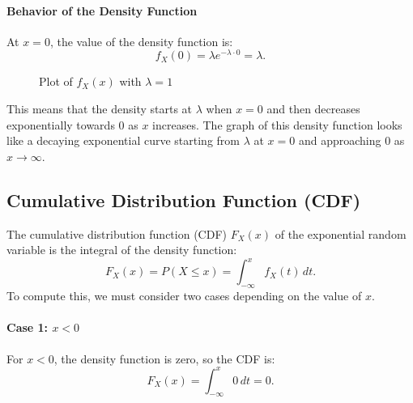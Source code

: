     \paragraph{Behavior of the Density Function}
    At $x = 0$, the value of the density function is:
    \[
    f_X(0) = \lambda e^{-\lambda \cdot 0} = \lambda.
    \]
    \begin{figure}[h]
        \centering
        \caption{Plot of $f_X(x)$ with $\lambda = 1$}
    \end{figure}
    This means that the density starts at $\lambda$ when $x = 0$ and then decreases exponentially towards 0 as $x$ increases. The graph of this density function looks like a decaying exponential curve starting from $\lambda$ at $x = 0$ and approaching 0 as $x \to \infty$.
    
    \subsection{Cumulative Distribution Function (CDF)}
    The cumulative distribution function (CDF) $F_X(x)$ of the exponential random variable is the integral of the density function:
    \[
    F_X(x) = P(X \leq x) = \int_{-\infty}^{x} f_X(t) \, dt.
    \]
    To compute this, we must consider two cases depending on the value of $x$.
    
    \paragraph{Case 1: $x < 0$}
    For $x < 0$, the density function is zero, so the CDF is:
    \[
    F_X(x) = \int_{-\infty}^{x} 0 \, dt = 0.
    \]
    
